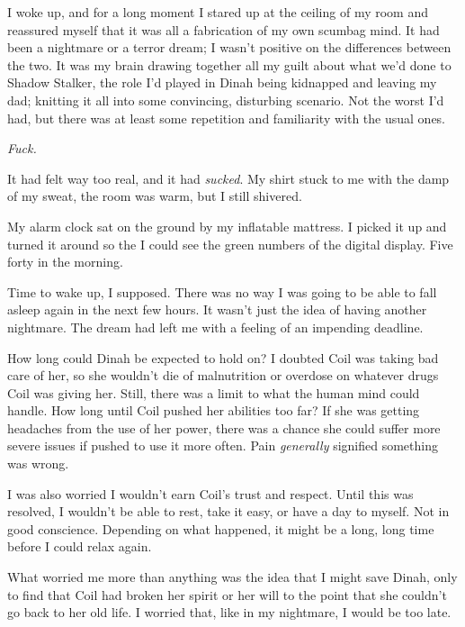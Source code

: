 \sectionbreak



I woke up, and for a long moment I stared up at the ceiling of my room and reassured myself that it was all a fabrication of my own scumbag mind.  It had been a nightmare or a terror dream; I wasn't positive on the differences between the two.  It was my brain drawing together all my guilt about what we'd done to Shadow Stalker, the role I'd played in Dinah being kidnapped and leaving my dad; knitting it all into some convincing, disturbing scenario.  Not the worst I'd had, but there was at least some repetition and familiarity with the usual ones.



\emph{Fuck.}



It had felt way too real, and it had \emph{sucked}.  My shirt stuck to me with the damp of my sweat, the room was warm, but I still shivered.



My alarm clock sat on the ground by my inflatable mattress.  I picked it up and turned it around so the I could see the green numbers of the digital display.  Five forty in the morning.



Time to wake up, I supposed.  There was no way I was going to be able to fall asleep again in the next few hours.  It wasn't just the idea of having another nightmare.  The dream had left me with a feeling of an impending deadline.



How long could Dinah be expected to hold on?  I doubted Coil was taking bad care of her, so she wouldn't die of malnutrition or overdose on whatever drugs Coil was giving her.  Still, there was a limit to what the human mind could handle.  How long until Coil pushed her abilities too far?  If she was getting headaches from the use of her power, there was a chance she could suffer more severe issues if pushed to use it more often.  Pain \emph{generally} signified something was wrong.



I was also worried I wouldn't earn Coil's trust and respect.  Until this was resolved, I wouldn't be able to rest, take it easy, or have a day to myself.  Not in good conscience.  Depending on what happened, it might be a long, long time before I could relax again.



What worried me more than anything was the idea that I might save Dinah, only to find that Coil had broken her spirit or her will to the point that she couldn't go back to her old life.  I worried that, like in my nightmare, I would be too late.



